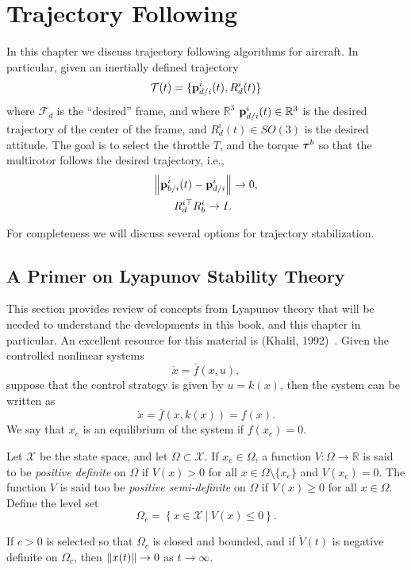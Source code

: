 \chapter{Trajectory Following}
\label{chap:trajectory_following}

In this chapter we discuss trajectory following algorithms for aircraft.  In particular, given an inertially defined trajectory 
\[
\mathbf{\mathcal{T}}(t) = \{\mathbf{p}_{d/i}^i(t), R_d^i(t)\}
\]
where $\mathcal{F}_d$ is the ``desired'' frame, and where $\mathbb{R}^3$ $\mathbf{p}_{d/i}^i(t)\in\mathbb{R}^3$ is the desired trajectory of the center of the frame, and $R_d^i(t)\in SO(3)$ is the desired attitude.  The goal is to select the throttle $T$, and the torque $\boldsymbol{\tau}^b$ so that the multirotor follows the desired trajectory, i.e., 
\begin{align*}
\left\|\mathbf{p}_{b/i}^i(t) - \mathbf{p}_{d/i}^i\right\| &\to 0, \\
R_d^{i\top} R_b^i \to I.
\end{align*}

For completeness we will discuss several options for trajectory stabilization.  


\section{A Primer on Lyapunov Stability Theory}

This section provides review of concepts from Lyapunov theory that will be needed to understand the developments in this book, and this chapter in particular.  An excellent resource for this material is (Khalil, 1992)~\cite{Khalil92}.  Given the controlled nonlinear systems 
\[
\dot{x}=\bar{f}(x,u),
\]
suppose that the control strategy is given by $u=k(x)$, then the system can be written as
\[
\dot{x} = \bar{f}(x,k(x)) = f(x).
\]
We say that $x_e$ is an equilibrium of the system if $f(x_e)=0$.

Let $\mathcal{X}$ be the state space, and let $\Omega\subset\mathcal{X}$.  If $x_e\in\Omega$, a function $V:\Omega\to\mathbb{R}$ is said to be {\em positive definite} on $\Omega$ if $V(x)>0$ for all $x\in\Omega\setminus\{x_e\}$ and $V(x_e)=0$.  The function $V$ is said too be {\em positive semi-definite} on $\Omega$ if $V(x)\geq 0$ for all $x\in\Omega$.  Define the level set
\[
\Omega_c = \left\{ x\in\mathcal{X} ~|~ V(x) \leq 0 \right\}.
\]

\begin{theorem} \label{thm:lyapunov_theorem}
If $c>0$ is selected so that $\Omega_c$ is closed and bounded, and if $\dot{V}(t)$ is negative definite on $\Omega_c$, then $\left\|x(t)\right\|\to 0$ as $t\to\infty$.
\end{theorem}


